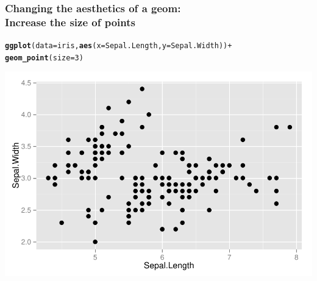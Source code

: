 \documentclass{beamer}\usepackage[]{graphicx}\usepackage[]{color}
\makeatletter
\newcommand{\hlnum}[1]{\textcolor[rgb]{0.686,0.059,0.569}{#1}}%
\newcommand{\hlopt}[1]{\textcolor[rgb]{0,0,0}{#1}}%
\newcommand{\hlstd}[1]{\textcolor[rgb]{0.345,0.345,0.345}{#1}}%
\newcommand{\hlkwc}[1]{\textcolor[rgb]{0.333,0.667,0.333}{#1}}%
\newcommand{\hlkwd}[1]{\textcolor[rgb]{0.737,0.353,0.396}{\textbf{#1}}}%
\newenvironment{kframe}{%
 \def\at@end@of@kframe{}%
 \ifinner\ifhmode%
  \def\at@end@of@kframe{\end{minipage}}%
  \begin{minipage}{\columnwidth}%
 \fi\fi%
 \def\FrameCommand##1{\hskip\@totalleftmargin \hskip-\fboxsep
 \colorbox{shadecolor}{##1}\hskip-\fboxsep
     \hskip-\linewidth \hskip-\@totalleftmargin \hskip\columnwidth}%
 \MakeFramed {\advance\hsize-\width
   \@totalleftmargin\z@ \linewidth\hsize
   \@setminipage}}%
 {\par\unskip\endMakeFramed%
 \at@end@of@kframe}
\newenvironment{knitrout}{}{} %
\makeatother
\begin{document}
\begin{frame}[fragile]
\frametitle{Changing the aesthetics of a geom: \\Increase the size of points}
\begin{knitrout}\footnotesize
{}\color{fgcolor}\begin{kframe}
\begin{alltt}
\hlkwd{ggplot}\hlstd{(}\hlkwc{data} \hlstd{= iris,} \hlkwd{aes}\hlstd{(}\hlkwc{x} \hlstd{= Sepal.Length,} \hlkwc{y} \hlstd{= Sepal.Width))} \hlopt{+}
\hlkwd{geom_point}\hlstd{(}\hlkwc{size} \hlstd{=} \hlnum{3}\hlstd{)}
\end{alltt}
\end{kframe}

{\centering \includegraphics[width=.75\linewidth]{figure/first_plot_size_} 

}



\end{knitrout}
\end{frame}

\end{document}
